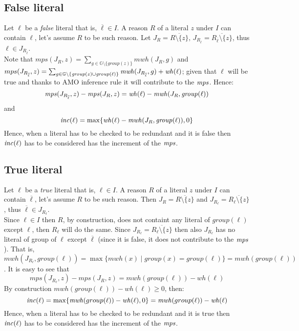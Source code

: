 \subsection{False literal}
Let $\ell$ be a \textit{false} literal that is,
$\overline{\ell} \in I$. 
A reason $R$ of a literal $z$ under $I$ can contain $\ell$, let's assume $R$ to be 
such reason.
Let $J_R = \overline{R \setminus \{z\}}$, 
$J_{R_{\overline{\ell}}} = \overline{R_{\overline{\ell}} \setminus \{z\}}$, thus
$\ell \in J_{R_{\overline{\ell}}}$.\\
Note that $mps(J_R,z) = \sum_{g \in \mathbb{G} \setminus
\{\mathit{group}(z)\}}{\mathit{mwh}(J_R,g)}$ and \\
$mps(J_{R_{\overline{\ell}}},z) = \sum_{g \in \mathbb{G} \setminus
\{\mathit{group}(z) \cup \mathit{group}(\ell)\}}
{\mathit{mwh}(J_{R_{\overline{\ell}}},g) + \mathit{wh}(\ell)}$;
given that $\ell$ will be true and thanks to AMO inference rule it will 
contribute to the $\mathit{mps}$.
Hence: $$\mathit{mps}(J_{R_{\overline{\ell}}},z)-\mathit{mps}(J_R,z) = 
\mathit{wh}(\ell) - \mathit{mwh}(J_R,\mathit{group}(\ell))$$ and 
$$ \mathit{inc}(\ell) = \max\{\mathit{wh}(\ell) - \mathit{mwh}(J_R,\mathit{group}(\ell)),0\}$$
Hence, when a literal has to be checked to be redundant and it is false then 
$\mathit{inc}(\ell)$ has to be considered has the increment of the $\mathit{mps}$.

\subsection{True literal}
Let $\ell$ be a \textit{true} literal that is,
$\ell \in I$. 
A reason $R$ of a literal $z$ under $I$ can contain $\overline{\ell}$, let's assume $R$ to be 
such reason.
Then  $J_R = \overline{R \setminus \{z\}}$ and $J_{R_{\ell}} = \overline{R_{\ell} \setminus \{z\}}$, thus
$\overline{\ell} \in J_{R_{\ell}}$.\\ 
Since $\ell \in I$ then $R$, by construction, does not containt any literal of $group(\ell)$ 
except $\ell$, then $R_{\ell}$ will do the same.
Since $J_{R_{\ell}} = \overline{R_{\ell} \setminus \{z\}}$ then also $J_{R_{\ell}}$ 
has no literal of group of $\ell$
except $\overline{\ell}$ (since it is false, it does not contribute to the $\mathit{mps}$).
That is, $\mathit{mwh}(J_{R_{\ell}},group(\ell))= \max\{ \mathit{mwh}(x) \mid \mathit{group}(x) = group(\ell) \} 
= \mathit{mwh}(group(\ell))$.
It is easy to see that
$$\mathit{mps}(J_{R_{\ell}},z)-\mathit{mps}(J_R,z) = \mathit{mwh}(group(\ell)) - \mathit{wh}(\ell)$$
By construction $\mathit{mwh}(group(\ell)) - \mathit{wh}(\ell) \ge 0$, then:
$$\mathit{inc}(\ell) = \max\{\mathit{mwh}(group(\ell)) - \mathit{wh}(\ell),0\} = \mathit{mwh}(group(\ell)) - \mathit{wh}(\ell)$$
Hence, when a literal has to be checked to be redundant and it is true then 
$\mathit{inc}(\ell)$ has to be considered has the increment of the $\mathit{mps}$.

